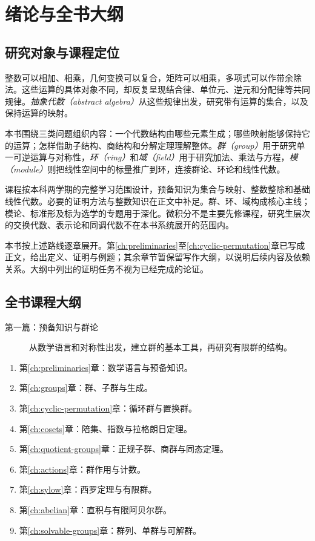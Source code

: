 \chapter{绪论与全书大纲}

\section{研究对象与课程定位}

整数可以相加、相乘，几何变换可以复合，矩阵可以相乘，多项式可以作带余除法。这些运算的具体对象不同，却反复呈现结合律、单位元、逆元和分配律等共同规律。\emph{抽象代数（abstract algebra）}从这些规律出发，研究带有运算的集合，以及保持运算的映射。

本书围绕三类问题组织内容：一个代数结构由哪些元素生成；哪些映射能够保持它的运算；怎样借助子结构、商结构和分解定理理解整体。\emph{群（group）}用于研究单一可逆运算与对称性，\emph{环（ring）}和\emph{域（field）}用于研究加法、乘法与方程，\emph{模（module）}则把线性空间中的标量推广到环，连接群论、环论和线性代数。

课程按本科两学期的完整学习范围设计，预备知识为集合与映射、整数整除和基础线性代数。必要的证明方法与整数知识在正文中补足。群、环、域构成核心主线；模论、标准形及标为选学的专题用于深化。微积分不是主要先修课程，研究生层次的交换代数、表示论和同调代数不在本书系统展开的范围内。

本书按上述路线逐章展开。第\ref{ch:preliminaries}至\ref{ch:cyclic-permutation}章已写成正文，给出定义、证明与例题；其余章节暂保留写作大纲，以说明后续内容及依赖关系。大纲中列出的证明任务不视为已经完成的论证。

\section{全书课程大纲}

\begin{description}
  \item[第一篇：预备知识与群论] 从数学语言和对称性出发，建立群的基本工具，再研究有限群的结构。
\end{description}
\begin{enumerate}
  \item 第\ref{ch:preliminaries}章：数学语言与预备知识。
  \item 第\ref{ch:groups}章：群、子群与生成。
  \item 第\ref{ch:cyclic-permutation}章：循环群与置换群。
  \item 第\ref{ch:cosets}章：陪集、指数与拉格朗日定理。
  \item 第\ref{ch:quotient-groups}章：正规子群、商群与同态定理。
  \item 第\ref{ch:actions}章：群作用与计数。
  \item 第\ref{ch:sylow}章：西罗定理与有限群。
  \item 第\ref{ch:abelian}章：直积与有限阿贝尔群。
  \item 第\ref{ch:solvable-groups}章：群列、单群与可解群。
\end{enumerate}

